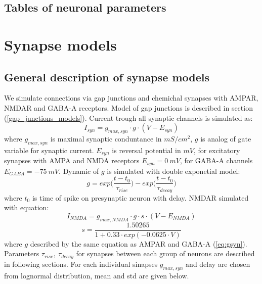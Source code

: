 \documentclass[a4paper,12pt]{article}
\begin{document}
\subsection{Tables of neuronal parameters} \label{tables_of_neurons}










\section{Synapse models} 
\subsection{General description of synapse models} \label{synapse_models}
We simulate connections  via  gap junctions and chemichal synapses with AMPAR, NMDAR and GABA-A receptors. Model of gap junctions is described in  section (\ref{gap_junctions_models}).
Current trough all synaptic channels is simulated as:
\begin{equation}
I_{syn} = g_{max, syn} \cdot g \cdot (V - E_{syn})
\end{equation}
where $ g_{max, syn}$ is maximal synaptic conduntance in $mS/cm^2$, $g$ is analog of gate variable for synaptic current. $E_{syn}$ is reversal potential in $mV$, for excitatory synapses with AMPA and NMDA receptors $E_{syn} = 0\ mV$, for GABA-A channels $E_{GABA} = -75\ mV$.
Dynamic of $g$ is simulated with double exponetial model: 
\begin{equation}
\label{eq:gsyn}
g = exp \Big( \frac{t - t_0}{\tau_{rise}} \Big) - exp \Big( \frac{t - t_0}{\tau_{decay}} \Big)
\end{equation}
where $t_0$ is time of spike on presynaptic neuron with delay.
NMDAR simulated with equation:
\begin{equation}
I_{NMDA} = g_{max, NMDA} \cdot g \cdot s \cdot (V - E_{NMDA})
\end{equation}
\begin{equation}
s = \frac{1.50265}{1 + 0.33 \cdot exp(-0.0625 \cdot V) }
\end{equation}
where $g$ described by the same equation as AMPAR and GABA-A (\ref{eq:gsyn}).
Parameters $\tau_{rise},\ \tau_{decay}$ for synapses between each group of neurons are described in following sections. For each individual sinapses $g_{max, syn}$ and delay are chosen from lognormal distribution, mean and std are given below.  
\end{document}
